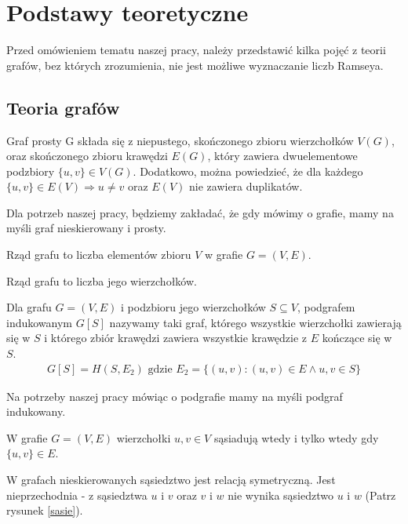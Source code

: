 \chapter{Podstawy teoretyczne} 
Przed omówieniem tematu naszej pracy, należy przedstawić kilka pojęć z teorii grafów, bez których zrozumienia, nie jest możliwe wyznaczanie liczb Ramseya.

  \section{Teoria grafów}
  \begin{definition}
    Graf prosty G składa się z niepustego, skończonego zbioru wierzchołków $V(G)$, oraz skończonego zbioru krawędzi $E(G)$, który zawiera dwuelementowe podzbiory $\{u,v\} \in V(G)$. Dodatkowo, można powiedzieć, że dla każdego $\{u,v\} \in E(V) \Rightarrow u \neq v$ oraz $E(V)$ nie zawiera duplikatów. \cite{graphtheory}
  \end{definition}

  Dla potrzeb naszej pracy, będziemy zakładać, że gdy mówimy o grafie, mamy na myśli graf nieskierowany i prosty.
  
  \begin{definition}
   Rząd grafu to liczba elementów zbioru $V$ w grafie $G=(V, E)$.
  \end{definition}

  Rząd grafu to liczba jego wierzchołków. 
  
       \begin{definition}
       Dla grafu $G=(V,E)$ i podzbioru jego wierzchołków $S \subseteq V$, 
       podgrafem indukowanym $G[S]$ nazywamy taki graf, którego wszystkie wierzchołki
       zawierają się w $S$ i którego zbiór krawędzi zawiera wszystkie krawędzie z $E$ kończące się w $S$. 
       \begin{align*}
       G[S] = H(S, E_2) \textrm{ gdzie }  E_2=\{(u,v):(u,v) \in E \wedge u,v \in S\}
       \end{align*}
     \end{definition}

     Na potrzeby naszej pracy mówiąc o podgrafie mamy na myśli podgraf indukowany.

  \begin{definition}[Sąsiedztwo]
    W grafie $G=(V, E)$ wierzchołki $u, v \in V$ sąsiadują wtedy i tylko wtedy gdy $\{u, v\} \in E$.    
  \end{definition}
  W grafach nieskierowanych sąsiedztwo jest relacją symetryczną. Jest nieprzechodnia - z sąsiedztwa $u$ i $v$ oraz $v$ i $w$ nie wynika sąsiedztwo $u$ i $w$ (Patrz rysunek \ref{sasie}).

